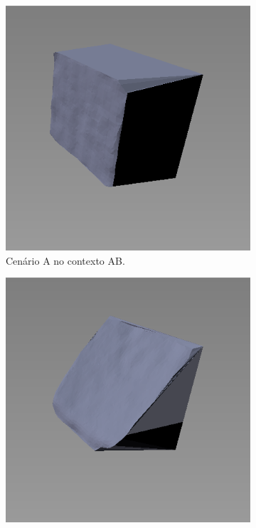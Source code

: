 \begin{figure}[H]
    \centering
    \begin{subfigure}[t]{0.33\textwidth}
        \includegraphics[width=\textwidth]{dados/figuras/AC1.png}
        \caption{Cenário A no contexto AB.}
    \end{subfigure}
    \hspace{1em}
    \begin{subfigure}[t]{0.33\textwidth}
        \includegraphics[width=\textwidth]{dados/figuras/AC2.png}

\end{subfigure}
\end{figure}
